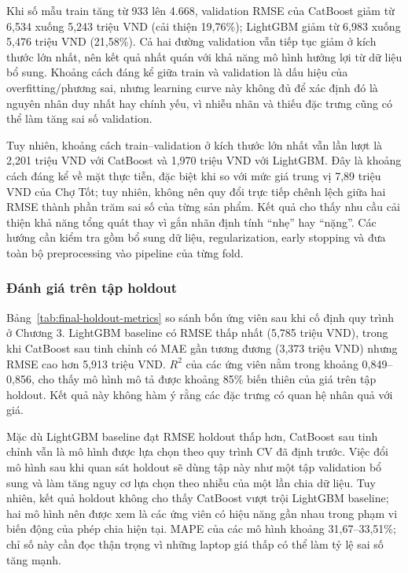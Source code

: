 Khi số mẫu train tăng từ 933 lên 4.668, validation RMSE của CatBoost giảm từ 6,534 xuống 5,243 triệu VND (cải thiện 19,76\%); LightGBM giảm từ 6,983 xuống 5,476 triệu VND (21,58\%). Cả hai đường validation vẫn tiếp tục giảm ở kích thước lớn nhất, nên kết quả nhất quán với khả năng mô hình hưởng lợi từ dữ liệu bổ sung. Khoảng cách đáng kể giữa train và validation là dấu hiệu của overfitting/phương sai, nhưng learning curve này không đủ để xác định đó là nguyên nhân duy nhất hay chính yếu, vì nhiễu nhãn và thiếu đặc trưng cũng có thể làm tăng sai số validation.

Tuy nhiên, khoảng cách train--validation ở kích thước lớn nhất vẫn lần lượt là 2,201 triệu VND với CatBoost và 1,970 triệu VND với LightGBM. Đây là khoảng cách đáng kể về mặt thực tiễn, đặc biệt khi so với mức giá trung vị 7,89 triệu VND của Chợ Tốt; tuy nhiên, không nên quy đổi trực tiếp chênh lệch giữa hai RMSE thành phần trăm sai số của từng sản phẩm. Kết quả cho thấy nhu cầu cải thiện khả năng tổng quát thay vì gắn nhãn định tính ``nhẹ'' hay ``nặng''. Các hướng cần kiểm tra gồm bổ sung dữ liệu, regularization, early stopping và đưa toàn bộ preprocessing vào pipeline của từng fold.

\subsubsection{Đánh giá trên tập holdout}

Bảng~\ref{tab:final-holdout-metrics} so sánh bốn ứng viên sau khi cố định quy trình ở Chương 3. LightGBM baseline có RMSE thấp nhất (5,785 triệu VND), trong khi CatBoost sau tinh chỉnh có MAE gần tương đương (3,373 triệu VND) nhưng RMSE cao hơn 5,913 triệu VND. $R^2$ của các ứng viên nằm trong khoảng 0,849--0,856, cho thấy mô hình mô tả được khoảng 85\% biến thiên của giá trên tập holdout. Kết quả này không hàm ý rằng các đặc trưng có quan hệ nhân quả với giá.



Mặc dù LightGBM baseline đạt RMSE holdout thấp hơn, CatBoost sau tinh chỉnh vẫn là mô hình được lựa chọn theo quy trình CV đã định trước. Việc đổi mô hình sau khi quan sát holdout sẽ dùng tập này như một tập validation bổ sung và làm tăng nguy cơ lựa chọn theo nhiễu của một lần chia dữ liệu. Tuy nhiên, kết quả holdout không cho thấy CatBoost vượt trội LightGBM baseline; hai mô hình nên được xem là các ứng viên có hiệu năng gần nhau trong phạm vi biến động của phép chia hiện tại. MAPE của các mô hình khoảng 31,67--33,51\%; chỉ số này cần đọc thận trọng vì những laptop giá thấp có thể làm tỷ lệ sai số tăng mạnh.

